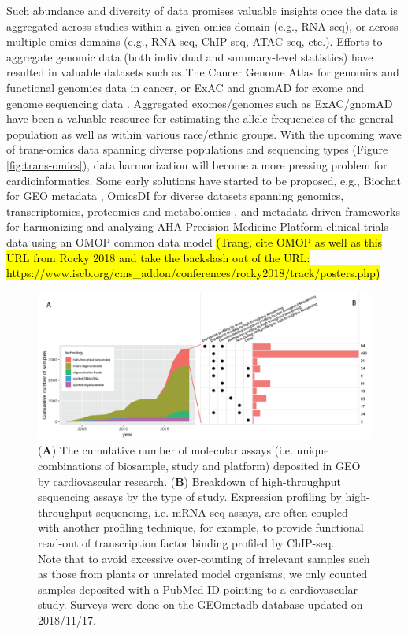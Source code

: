 \documentclass[letter]{bioinfo}
\begin{document}
	Such abundance and diversity of data promises valuable insights once the data is aggregated across studies within a given omics domain (e.g., RNA-seq), or across multiple omics domains (e.g., RNA-seq, ChIP-seq, ATAC-seq, etc.). Efforts to aggregate genomic data (both individual and summary-level statistics) have resulted in valuable datasets such as The Cancer Genome Atlas \citep{TCGA:2013:Cancer} for genomics and functional genomics data in cancer, or ExAC and gnomAD for exome and genome sequencing data \citep{Lek:2016:Analysis}. Aggregated exomes/genomes such as ExAC/gnomAD have been a valuable resource for estimating the allele frequencies of the general population as well as within various race/ethnic groups. With the upcoming wave of trans-omics data spanning diverse populations and sequencing types (Figure \ref{fig:trans-omics}), data harmonization will become a more pressing problem for cardioinformatics. Some early solutions have started to be proposed, e.g., Biochat for GEO metadata \citep{Khomtchouk:2018:Biochat}, OmicsDI for diverse datasets spanning genomics, transcriptomics, proteomics and metabolomics \citep{Perez-Riverol:2017:Discovering}, and metadata-driven frameworks for harmonizing and analyzing AHA Precision Medicine Platform clinical trials data using an OMOP common data model \hl{(Trang, cite OMOP as well as this URL from Rocky 2018 and take the backslash out of the URL: https://www.iscb.org/cms\_addon/conferences/rocky2018/track/posters.php)}
	
	\begin{figure}[!tpb]
		\includegraphics[width=1\linewidth]{assay-count-cardio}
		\caption{(\textbf{A}) The cumulative number of molecular assays (i.e. unique combinations of biosample, study and platform) deposited in GEO by cardiovascular research. (\textbf{B}) Breakdown of high-throughput sequencing assays by the type of study. Expression profiling by high-throughput sequencing, i.e. mRNA-seq assays, are often coupled with another profiling technique, for example, to provide functional read-out of transcription factor binding profiled by ChIP-seq. \label{fig:geo-assay}\\ Note that to avoid excessive over-counting of irrelevant samples such as those from plants or unrelated model organisms, we only counted samples deposited with a PubMed ID pointing to a cardiovascular study. Surveys were done on the GEOmetadb database \citep{Zhu:2008:GEOmetadb} updated on 2018/11/17.}
	\end{figure} 
	
\end{document}
